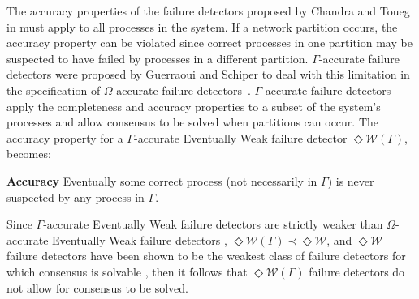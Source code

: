 The accuracy properties of the failure detectors proposed by Chandra and Toueg in \cite{DeepakChandra1996} must apply to all processes in the system. If a network partition occurs, the accuracy property can be violated since correct processes in one partition may be suspected to have failed by processes in a different  partition. $\Gamma$-accurate failure detectors were proposed by Guerraoui and Schiper to deal with this limitation in the specification of $\Omega$-accurate failure detectors~\cite{Guerraoui96gammaaccurate}. $\Gamma$-accurate failure detectors apply the completeness and accuracy properties to a subset of the system's processes and allow consensus to be solved when partitions can occur. The accuracy property for a $\Gamma$-accurate Eventually Weak failure detector $\Diamond\mathcal{W}(\Gamma)$, becomes: \par
\textbf{Accuracy} Eventually some correct process (not necessarily in $\Gamma$) is never suspected by any process in $\Gamma$.\par
Since $\Gamma$-accurate Eventually Weak failure detectors are strictly weaker than $\Omega$-accurate Eventually Weak failure detectors \cite{Guerraoui96gammaaccurate}, $\Diamond\mathcal{W}(\Gamma) \prec \Diamond\mathcal{W}$, and  $\Diamond\mathcal{W}$ failure detectors have been shown to be the weakest class of failure detectors for which consensus is solvable \cite{Chandra1996}, then it follows that $\Diamond\mathcal{W}(\Gamma)$ failure detectors do not allow for consensus to be solved.\par
